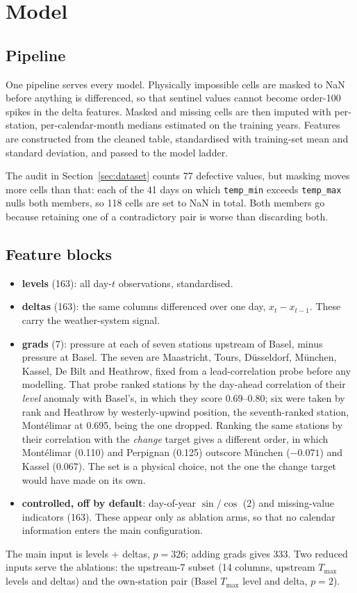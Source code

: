 \documentclass[11pt,a4paper]{article}
\begin{document}
\section{Model}
\label{sec:model}

\subsection{Pipeline}
\label{sec:pipeline}

One pipeline serves every model. Physically impossible cells are masked to NaN before anything is differenced, so that sentinel values cannot become order-100 spikes in the delta features. Masked and missing cells are then imputed with per-station, per-calendar-month medians estimated on the training years. Features are constructed from the cleaned table, standardised with training-set mean and standard deviation, and passed to the model ladder.

The audit in Section~\ref{sec:dataset} counts 77 defective values, but masking moves more cells than that: each of the 41 days on which \texttt{temp\_min} exceeds \texttt{temp\_max} nulls both members, so 118 cells are set to NaN in total. Both members go because retaining one of a contradictory pair is worse than discarding both.

\subsection{Feature blocks}
\label{sec:features}

\begin{itemize}
\item \textbf{levels} (163): all day-$t$ observations, standardised.
\item \textbf{deltas} (163): the same columns differenced over one day, $x_t - x_{t-1}$. These carry the weather-system signal.
\item \textbf{grads} (7): pressure at each of seven stations upstream of Basel, minus pressure at Basel. The seven are Maastricht, Tours, D\"usseldorf, M\"unchen, Kassel, De Bilt and Heathrow, fixed from a lead-correlation probe before any modelling. That probe ranked stations by the day-ahead correlation of their \emph{level} anomaly with Basel's, in which they score 0.69--0.80; six were taken by rank and Heathrow by westerly-upwind position, the seventh-ranked station, Mont\'elimar at 0.695, being the one dropped. Ranking the same stations by their correlation with the \emph{change} target gives a different order, in which Mont\'elimar (0.110) and Perpignan (0.125) outscore M\"unchen ($-0.071$) and Kassel (0.067). The set is a physical choice, not the one the change target would have made on its own.
\item \textbf{controlled, off by default}: day-of-year $\sin/\cos$ (2) and missing-value indicators (163). These appear only as ablation arms, so that no calendar information enters the main configuration.
\end{itemize}
The main input is levels $+$ deltas, $p = 326$; adding grads gives 333. Two reduced inputs serve the ablations: the upstream-7 subset (14 columns, upstream $T_{\max}$ levels and deltas) and the own-station pair (Basel $T_{\max}$ level and delta, $p = 2$).
\end{document}
